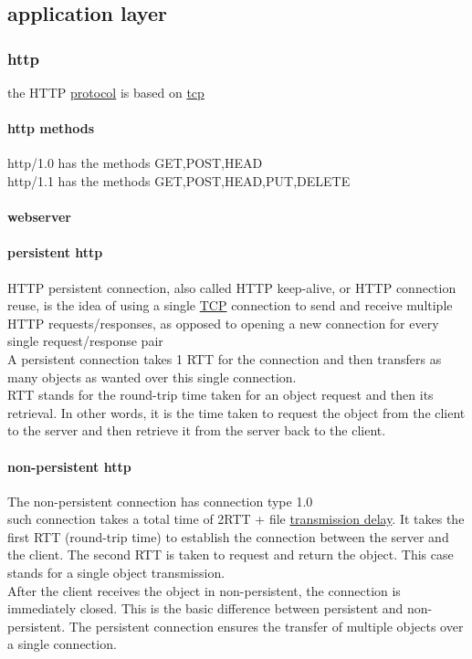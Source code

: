 \documentclass[a4paper,12pt]{article}
\begin{document}
\subsection{application layer}
\label{sec:org63b7a34}
\subsubsection{http}
\label{sec:orgca25566}
the HTTP \hyperref[sec:org040283e]{protocol} is based on \hyperref[sec:org287582b]{tcp}\\
\paragraph{http methods}
\label{sec:org77dcdbb}
http/1.0 has the methods GET,POST,HEAD\\
http/1.1 has the methods GET,POST,HEAD,PUT,DELETE\\
\paragraph{webserver}
\label{sec:org0e817af}
\paragraph{persistent http}
\label{sec:org3a28113}
HTTP persistent connection, also called HTTP keep-alive, or HTTP connection reuse, is the idea of using a single \hyperref[sec:org287582b]{TCP} connection to send and receive multiple HTTP requests/responses, as opposed to opening a new connection for every single request/response pair\\
A persistent connection takes 1 RTT for the connection and then transfers as many objects as wanted over this single connection.\\
RTT stands for the round-trip time taken for an object request and then its retrieval. In other words, it is the time taken to request the object from the client to the server and then retrieve it from the server back to the client.\\
\paragraph{non-persistent http}
\label{sec:org0bab3c2}
The non-persistent connection has connection type 1.0\\
such connection takes a total time of 2RTT + file \hyperref[sec:org840ebaa]{transmission delay}. It takes the first RTT (round-trip time) to establish the connection between the server and the client. The second RTT is taken to request and return the object. This case stands for a single object transmission.\\
After the client receives the object in non-persistent, the connection is immediately closed. This is the basic difference between persistent and non-persistent. The persistent connection ensures the transfer of multiple objects over a single connection.\\
\end{document}
